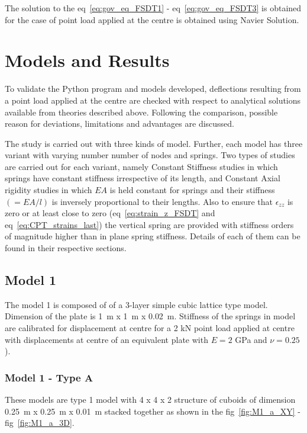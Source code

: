 The solution to the eq~\ref{eq:gov_eq_FSDT1} - eq~\ref{eq:gov_eq_FSDT3} is obtained for the case of point load applied at the centre is obtained using Navier Solution. 

\section{Models and Results}
To validate the Python program and models developed, deflections resulting from a point load applied at the centre are checked with respect to analytical solutions available from theories described above. Following the comparison, possible reason for deviations, limitations and advantages are discussed.

The study is carried out with three kinds of model. Further, each model has three variant with varying number number of nodes and springs. Two types of studies are carried out for each variant, namely Constant Stiffness studies in which springs have constant stiffness irrespective of its length, and Constant Axial rigidity studies in which $EA$ is held constant for springs and their stiffness$(= EA/l)$ is inversely proportional to their lengths. Also to ensure that $\epsilon_{zz}$ is zero or at least close to zero (eq~\ref{eq:strain_z_FSDT} and eq~\ref{eq:CPT_strains_last}) the vertical spring are provided with stiffness orders of magnitude higher than in plane spring stiffness. Details of each of them can be found in their respective sections.

\subsection{Model 1}
The model 1 is composed of of a 3-layer simple cubic lattice type model. Dimension of the plate is 1~m x 1~m x 0.02~m. Stiffness of the springs in model are calibrated for displacement at centre for a 2 kN point load applied at centre with displacements at centre of an equivalent plate with $E = 2$ GPa and $\nu = 0.25$).

\subsubsection{Model 1 - Type A}
These models are type 1 model with 4 x 4 x 2 structure of cuboids of dimension 0.25~m x 0.25~m x 0.01~m stacked together as shown in the fig~\ref{fig:M1_a_XY} - fig~\ref{fig:M1_a_3D}.

